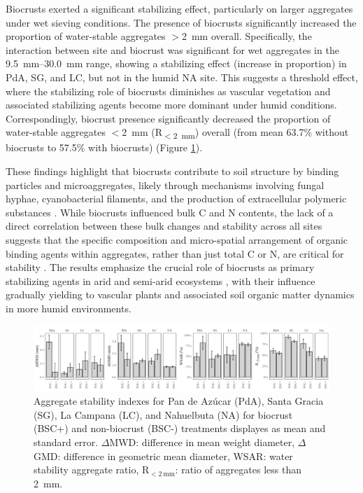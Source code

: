 Biocrusts exerted a significant stabilizing effect, particularly on larger aggregates under wet sieving conditions. The presence of biocrusts significantly increased the proportion of water-stable aggregates $>$\SI{2}{\milli\meter} overall. Specifically, the interaction between site and biocrust was significant for wet aggregates in the \SIrange[range-phrase=--,range-units=single]{9.5}{30.0}{\milli\meter} range, showing a stabilizing effect (increase in proportion) in PdA, SG, and LC, but not in the humid NA site. This suggests a threshold effect, where the stabilizing role of biocrusts diminishes as vascular vegetation and associated stabilizing agents become more dominant under humid conditions. Correspondingly, biocrust presence significantly decreased the proportion of water-stable aggregates $<$\SI{2}{\milli\meter} (R\textsubscript{$<$\SI{2}{\milli\meter}}) overall (from mean 63.7\% without biocrusts to 57.5\% with biocrusts) (Figure \ref{fig:aggregate-stability}).

These findings highlight that biocrusts contribute to soil structure by binding particles and microaggregates, likely through mechanisms involving fungal hyphae, cyanobacterial filaments, and the production of extracellular polymeric substances \citep{Six2004,Totsche2018}. While biocrusts influenced bulk C and N contents, the lack of a direct correlation between these bulk changes and stability across all sites suggests that the specific composition and micro-spatial arrangement of organic binding agents within aggregates, rather than just total C or N, are critical for stability \citep{Wagner2007}. The results emphasize the crucial role of biocrusts as primary stabilizing agents in arid and semi-arid ecosystems \citep{BelnapBüdel2016}, with their influence gradually yielding to vascular plants and associated soil organic matter dynamics in more humid environments.

\begin{figure}[h!]
	\centering
	\includegraphics[width=1\textwidth]{img/aggregate stability indexes_se.png}
	\caption{Aggregate stability indexes for Pan de Azúcar (PdA), Santa Gracia (SG), La Campana (LC), and Nahuelbuta (NA) for biocrust (BSC+) and non-biocrust (BSC-) treatments displayes as mean and standard error. $\Delta$MWD: difference in mean weight diameter, $\Delta$GMD: difference in geometric mean diameter, WSAR: water stability aggregate ratio, R$_{<\SI{2}{\milli\meter}}$: ratio of aggregates less than \SI{2}{\milli\meter}.}
	\label{fig:aggregate-stability}
\end{figure}
\FloatBarrier

